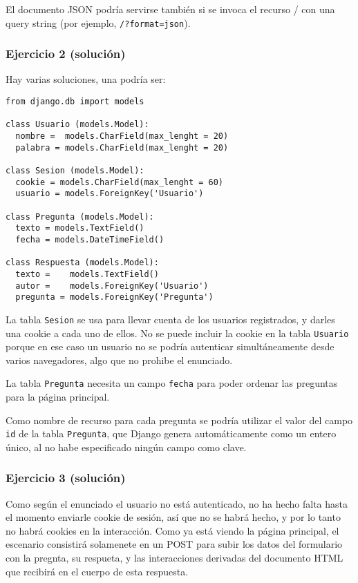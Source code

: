 El documento JSON podría servirse también si se invoca el recurso / con una query string (por ejemplo, \texttt{/?format=json}).


\subsubsection{Ejercicio 2  (solución)}

Hay varias soluciones, una podría ser:

\begin{verbatim}
from django.db import models

class Usuario (models.Model):
  nombre =  models.CharField(max_lenght = 20)
  palabra = models.CharField(max_lenght = 20)

class Sesion (models.Model):
  cookie = models.CharField(max_lenght = 60)
  usuario = models.ForeignKey('Usuario')

class Pregunta (models.Model):
  texto = models.TextField()
  fecha = models.DateTimeField()

class Respuesta (models.Model):
  texto =    models.TextField()
  autor =    models.ForeignKey('Usuario')
  pregunta = models.ForeignKey('Pregunta')
\end{verbatim}

La tabla \texttt{Sesion} se usa para llevar cuenta de los usuarios registrados, y darles una cookie a cada uno de ellos. No se puede incluir la cookie en la tabla \texttt{Usuario} porque en ese caso un usuario no se podría autenticar simultáneamente desde varios navegadores, algo que no prohibe el enunciado.

La tabla \texttt{Pregunta} necesita un campo \texttt{fecha} para poder ordenar las preguntas para la página principal.

Como nombre de recurso para cada pregunta se podría utilizar el valor del campo \texttt{id} de la tabla \texttt{Pregunta}, que Django genera automáticamente como un entero único, al no habe especificado ningún campo como clave.


\subsubsection{Ejercicio 3  (solución)}

Como según el enunciado el usuario no está autenticado, no ha hecho falta hasta el momento enviarle cookie de sesión, así que no se habrá hecho, y por lo tanto no habrá cookies en la interacción. Como ya está viendo la página principal, el escenario consistirá solamenete en un POST para subir los datos del formulario con la pregnta, su respueta, y las interacciones derivadas del documento HTML que recibirá en el cuerpo de esta respuesta.


